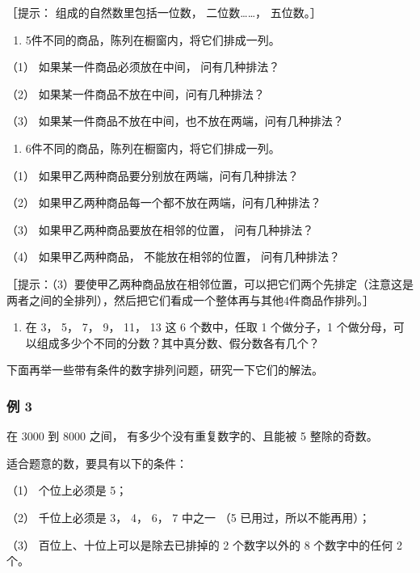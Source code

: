 ［提示： 组成的自然数里包括一位数， 二位数\ldots\ldots， 五位数。］

\begin{enumerate}[start=2]
\item
  5件不同的商品，陈列在橱窗内，将它们排成一列。
\end{enumerate}

（1） 如果某一件商品必须放在中间， 问有几种排法？

（2） 如果某一件商品不放在中间，问有几种排法？

（3） 如果某一件商品不放在中间，也不放在两端，问有几种排法？

\begin{enumerate}[start=3]
\item
  6件不同的商品，陈列在橱窗内，将它们排成一列。
\end{enumerate}

（1） 如果甲乙两种商品要分别放在两端，问有几种排法？

（2） 如果甲乙两种商品每一个都不放在两端，问有几种排法？

（3） 如果甲乙两种商品要放在相邻的位置， 问有几种排法？

（4） 如果甲乙两种商品， 不能放在相邻的位置， 问有几种排法？

［提示：（3）要使甲乙两种商品放在相邻位置，可以把它们两个先排定（注意这是两者之间的全排列），然后把它们看成一个整体再与其他4件商品作排列。］

\begin{enumerate}[start=4]
\item
  在 3， 5， 7， 9， 11， 13 这 6 个数中，任取 1 个做分子，1
  个做分母，可以组成多少个不同的分数？其中真分数、假分数各有几个？
\end{enumerate}

下面再举一些带有条件的数字排列问题，研究一下它们的解法。

\subsubsection{例 3}

在 3000 到 8000 之间， 有多少个没有重复数字的、且能被 5 整除的奇数。

 适合题意的数，要具有以下的条件：

（1） 个位上必须是 5；

（2） 千位上必须是 3， 4， 6， 7 中之一 （5 已用过，所以不能再用）；

（3） 百位上、十位上可以是除去已排掉的 2 个数字以外的 8 个数字中的任何 2
个。

